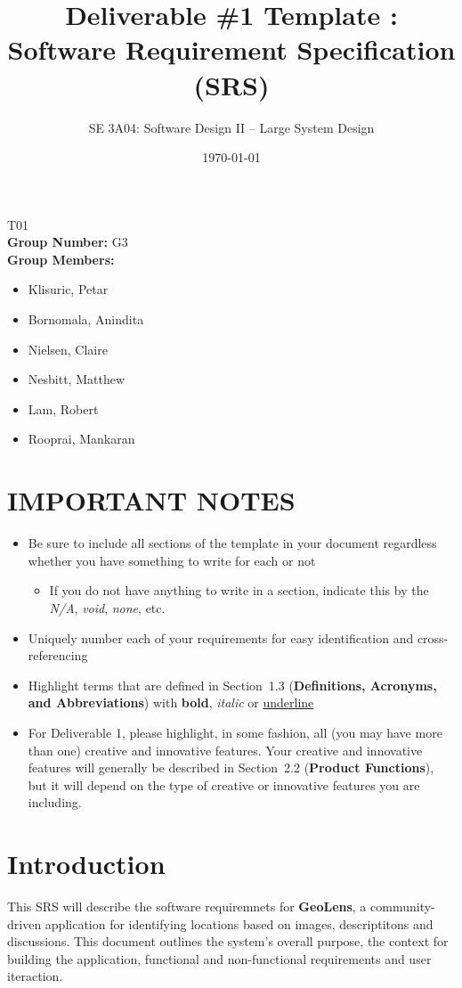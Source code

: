 \documentclass[]{article}
\title{Deliverable \#1 Template : Software Requirement Specification (SRS)}
\author{SE 3A04: Software Design II -- Large System Design}
\date{\today}
\begin{document}
\maketitle	
{} T01\\
{\bf Group Number:} G3 \\
{\bf Group Members:} 
\begin{itemize}
	\item Klisuric, Petar
    \item Bornomala, Anindita
    \item Nielsen, Claire
    \item Nesbitt, Matthew
    \item Lam, Robert 
    \item Rooprai, Mankaran
\end{itemize}

\section*{IMPORTANT NOTES}
\begin{itemize}
	\item Be sure to include all sections of the template in your document regardless whether you have something to write for each or not
	\begin{itemize}
		\item If you do not have anything to write in a section, indicate this by the \emph{N/A}, \emph{void}, \emph{none}, etc.
	\end{itemize}
	\item Uniquely number each of your requirements for easy identification and cross-referencing
	\item Highlight terms that are defined in Section~1.3 (\textbf{Definitions, Acronyms, and Abbreviations}) with \textbf{bold}, \emph{italic} or \underline{underline}
	\item For Deliverable 1, please highlight, in some fashion, all (you may have more than one) creative and innovative features. Your creative and innovative features will generally be described in Section~2.2 (\textbf{Product Functions}), but it will depend on the type of creative or innovative features you are including.
\end{itemize}

\newpage
\section{Introduction}
\label{sec:introduction}
This SRS will describe the software requiremnets for \textbf{GeoLens}, a community-driven application for identifying
locations based on images, descriptitons and discussions. This document outlines the system's overall purpose, the context for building the application,
functional and non-functional requirements and user iteraction.
\end{document}
